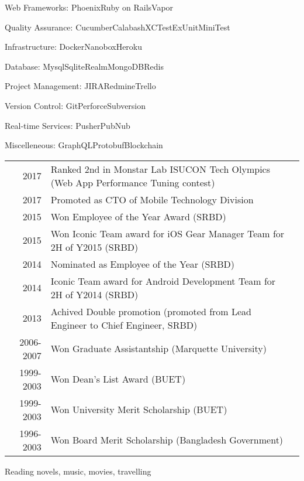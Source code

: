 \documentclass[10pt,a4paper]{article} %
\begin{document}
\inlineheadsection %
{Web Frameworks:}
{Phoenix\bull Ruby on Rails\bull Vapor}

\inlineheadsection %
{Quality Assurance:}
{Cucumber\bull Calabash\bull XCTest\bull ExUnit\bull MiniTest}

\inlineheadsection %
{Infrastructure:}
{Docker\bull Nanobox\bull Heroku}

\inlineheadsection %
{Database:}
{Mysql\bull Sqlite\bull Realm\bull MongoDB\bull Redis}

\inlineheadsection %
{Project Management:}
{JIRA\bull Redmine\bull Trello}

\inlineheadsection %
{Version Control:}
{Git\bull Perforce\bull Subversion}

\inlineheadsection %
{Real-time Services:}
{Pusher\bull PubNub}

\inlineheadsection %
{Miscelleneous:}
{GraphQL\bull Protobuf\bull Blockchain}



\spacedhrule{1.6em}{-0.4em} %

\begin{tabular}{rll}
2017	   &    Ranked 2nd in Monstar Lab ISUCON Tech Olympics (Web App Performance Tuning contest) \\
2017   &     Promoted as CTO of Mobile Technology Division \\
2015	   &    Won Employee of the Year Award (SRBD)\\
2015	   &    Won Iconic Team award for iOS Gear Manager Team for 2H of Y2015 (SRBD)\\
2014   &    Nominated as Employee of the Year (SRBD)\\
2014	   &    Iconic Team award for Android Development Team for 2H of Y2014 (SRBD)\\
2013   &    Achived Double promotion (promoted from Lead Engineer to Chief Engineer, SRBD) \\
2006-2007 &    Won Graduate Assistantship (Marquette University)\\
1999-2003 &    Won Dean's List Award (BUET)\\
1999-2003 &    Won University Merit Scholarship (BUET)\\
1996-2003 &    Won Board Merit Scholarship (Bangladesh Government)
\end{tabular}


{Reading novels, music, movies, travelling}
\end{document}
